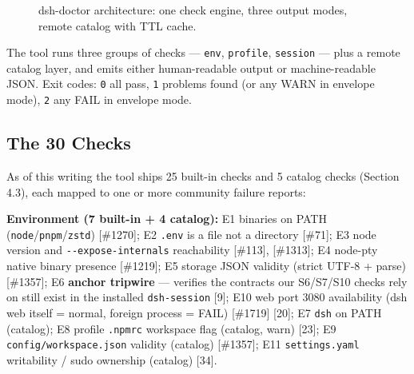 \documentclass[11pt]{article}
\begin{document}
\begin{figure}[H]
\centering
{}
\caption{dsh-doctor architecture: one check engine, three output modes, remote catalog with TTL cache.}
\label{fig:arch}
\end{figure}

The tool runs three groups of checks --- \texttt{env}, \texttt{profile},
\texttt{session} --- plus a remote catalog layer, and emits either
human-readable output or machine-readable JSON. Exit codes: \texttt{0}
all pass, \texttt{1} problems found (or any WARN in envelope mode),
\texttt{2} any FAIL in envelope mode.

\subsection{The 30 Checks}\label{the-30-checks}

As of this writing the tool ships 25 built-in checks and 5 catalog
checks (Section 4.3), each mapped to one or more community failure
reports:

\textbf{Environment (7 built-in + 4 catalog):} E1 binaries on PATH
(\texttt{node}/\texttt{pnpm}/\texttt{zstd}) [\#1270]; E2
\texttt{.env} is a file not a directory [\#71]; E3 node version and
\texttt{-\/-expose-internals} reachability [\#113], [\#1313]; E4
node-pty native binary presence [\#1219]; E5 storage JSON validity
(strict UTF-8 + parse) [\#1357]; E6 \textbf{anchor tripwire} ---
verifies the contracts our S6/S7/S10 checks rely on still exist in the
installed \texttt{dsh-session} [9]; E10 web port 3080 availability
(dsh web itself = normal, foreign process = FAIL) [\#1719] [20];
E7 \texttt{dsh} on PATH (catalog); E8 profile \texttt{.npmrc} workspace
flag (catalog, warn) [23]; E9 \texttt{config/workspace.json}
validity (catalog) [\#1357]; E11 \texttt{settings.yaml} writability
/ sudo ownership (catalog) [34].
\end{document}
